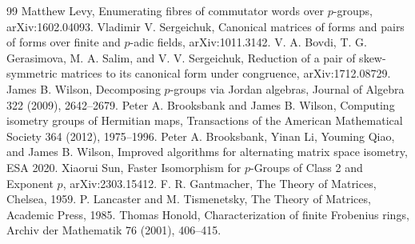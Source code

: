 \documentclass[11pt]{article}
\begin{document}
\begin{thebibliography}{99}
 Matthew Levy, Enumerating fibres of commutator words over $p$-groups, arXiv:1602.04093.
 Vladimir V. Sergeichuk, Canonical matrices of forms and pairs of forms over finite and $p$-adic fields, arXiv:1011.3142.
 V. A. Bovdi, T. G. Gerasimova, M. A. Salim, and V. V. Sergeichuk, Reduction of a pair of skew-symmetric matrices to its canonical form under congruence, arXiv:1712.08729.
 James B. Wilson, Decomposing $p$-groups via Jordan algebras, Journal of Algebra 322 (2009), 2642--2679.
 Peter A. Brooksbank and James B. Wilson, Computing isometry groups of Hermitian maps, Transactions of the American Mathematical Society 364 (2012), 1975--1996.
 Peter A. Brooksbank, Yinan Li, Youming Qiao, and James B. Wilson, Improved algorithms for alternating matrix space isometry, ESA 2020.
 Xiaorui Sun, Faster Isomorphism for $p$-Groups of Class 2 and Exponent $p$, arXiv:2303.15412.
 F. R. Gantmacher, The Theory of Matrices, Chelsea, 1959.
 P. Lancaster and M. Tismenetsky, The Theory of Matrices, Academic Press, 1985.
 Thomas Honold, Characterization of finite Frobenius rings, Archiv der Mathematik 76 (2001), 406--415.
\end{thebibliography}
\end{document}
